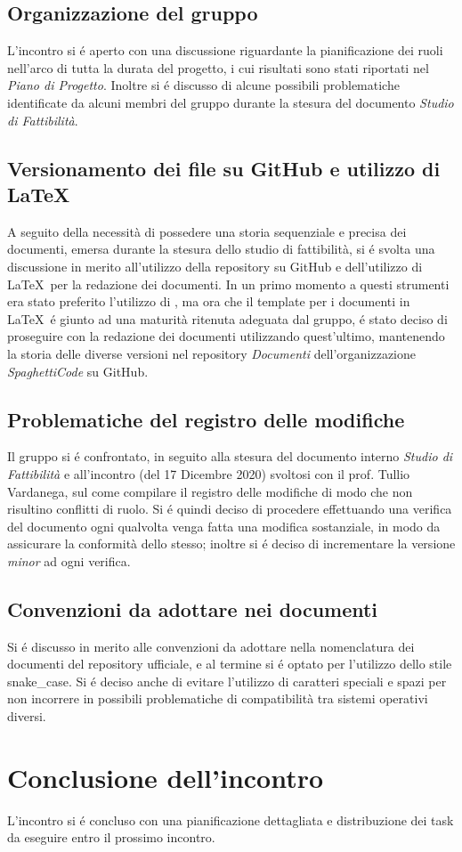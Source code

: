\documentclass{article}
\begin{document}
	\subsection{Organizzazione del gruppo}
	\label{sub:organizzazione_gruppo}
	L'incontro si é aperto con una discussione riguardante la pianificazione dei ruoli nell'arco di tutta la durata del progetto, i cui risultati sono stati riportati nel
	\textit{Piano di Progetto}. Inoltre si é discusso di alcune possibili problematiche identificate da alcuni membri del gruppo durante la stesura del documento
	\textit{Studio di Fattibilità}.

	\subsection{Versionamento dei file su GitHub e utilizzo di \LaTeX}
	\label{sub:git_latex}
	A seguito della necessità di possedere una storia sequenziale e precisa dei documenti, emersa durante la stesura dello studio di fattibilità, si é svolta una discussione in merito
	all'utilizzo della repository su GitHub e dell'utilizzo di \LaTeX\ per la redazione dei documenti. In un primo momento a questi strumenti era stato preferito
	l'utilizzo di , ma ora che il template per i documenti in \LaTeX\ é giunto ad una maturità ritenuta adeguata dal gruppo, é stato deciso di
	proseguire con la redazione dei documenti utilizzando quest'ultimo, mantenendo la storia delle diverse versioni nel repository \textit{Documenti} dell'organizzazione
	\emph{SpaghettiCode} su GitHub.

	\subsection{Problematiche del registro delle modifiche}
	\label{sub:registro_modifiche}
	Il gruppo si é confrontato, in seguito alla stesura del documento interno \textit{Studio di Fattibilità} e all'incontro (del 17 Dicembre 2020) svoltosi con il prof. Tullio
	Vardanega, sul come compilare il registro delle modifiche di modo che non risultino conflitti di ruolo. Si é quindi deciso di procedere effettuando una verifica del documento ogni
	qualvolta venga fatta una modifica sostanziale, in modo da assicurare la conformità dello stesso; inoltre si é deciso di incrementare la versione \textit{minor} ad ogni verifica.

	\subsection{Convenzioni da adottare nei documenti}
	\label{sub:convenzioni}
	Si é discusso in merito alle convenzioni da adottare nella nomenclatura dei documenti del repository ufficiale, e al termine si é optato per l'utilizzo dello stile \glossario
	{snake\_case}. Si é deciso anche di evitare l'utilizzo di caratteri speciali e spazi per non incorrere in possibili problematiche di compatibilità tra sistemi operativi diversi.

\section{Conclusione dell'incontro}
\label{sec:conclusione}
L'incontro si é concluso con una pianificazione dettagliata e distribuzione dei task da eseguire entro il prossimo incontro.
\end{document}
